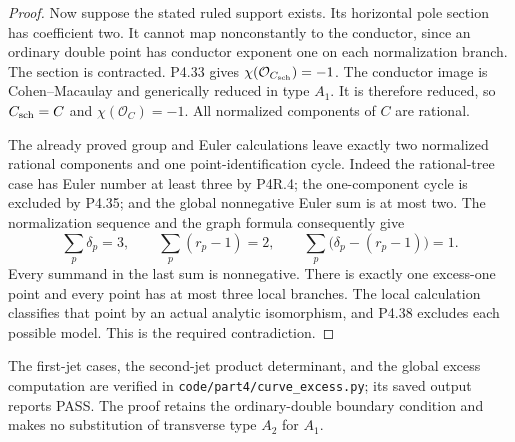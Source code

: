 \begin{proof}
Now suppose the stated ruled support exists. Its horizontal
pole section has coefficient two. It cannot map
nonconstantly to the conductor, since an ordinary double
point has conductor exponent one on each normalization
branch. The section is contracted. P4.33 gives
$\chi(\mathcal O_{C_{\rm sch}})=-1$.
The conductor image is Cohen--Macaulay and generically
reduced in type $A_1$. It is therefore reduced, so
$C_{\rm sch}=C$ and $\chi(\mathcal O_C)=-1$.
All normalized components of $C$ are rational.

The already proved group and Euler calculations leave
exactly two normalized rational components and one
point-identification cycle. Indeed the rational-tree case
has Euler number at least three by P4R.4; the
one-component cycle is excluded by P4.35; and the global
nonnegative Euler sum is at most two. The normalization
sequence and the graph formula consequently give
\[
 \sum_p\delta_p=3,\qquad
 \sum_p(r_p-1)=2,
 \qquad
 \sum_p\bigl(\delta_p-(r_p-1)\bigr)=1.
\]
Every summand in the last sum is nonnegative. There is
exactly one excess-one point and every point has at most
three local branches. The local calculation classifies that
point by an actual analytic isomorphism, and P4.38 excludes
each possible model. This is the required contradiction.
\end{proof}

The first-jet cases, the second-jet product determinant, and
the global excess computation are verified in
\texttt{code/part4/curve\_excess.py}; its saved output reports
PASS. The proof retains the ordinary-double boundary
condition and makes no substitution of transverse type
$A_2$ for $A_1$.
